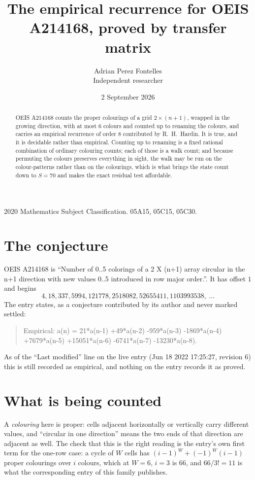\documentclass[11pt,a4paper]{article}
\title{The empirical recurrence for OEIS A214168, proved by transfer matrix}
\author{Adrian Perez Fontelles\\ \small Independent researcher}
\date{2 September 2026}
\theoremstyle{plain}
\theoremstyle{definition}
\begin{document}
\maketitle

\begin{abstract}
OEIS A214168 counts the proper colourings of a grid $2\times(n+1)$, wrapped in the growing direction, with at most $6$ colours and
counted up to renaming the colours, and carries an empirical recurrence of order $8$
contributed by R.~H.~Hardin. It is true, and it is decidable rather than empirical. Counting
up to renaming is a fixed rational combination of ordinary colouring counts; each of those is
a walk count; and because permuting the colours preserves everything in sight, the walk may be
run on the colour-patterns rather than on the colourings, which is what brings the state count
down to $S=70$ and makes the exact residual test affordable.
\end{abstract}

\noindent\small 2020 Mathematics Subject Classification. 05A15, 05C15, 05C30.\normalsize

\section{The conjecture}

OEIS A214168 is ``Number of 0..5 colorings of a 2 X (n+1) array circular in the n+1 direction with new values 0..5 introduced in row major order.''. It has offset $1$ and begins
\[
4, 18, 337, 5994, 121778, 2518082, 52655411, 1103993538,\ \dots
\]
The entry states, as a conjecture contributed by its author and never marked settled:
\begin{quote}
Empirical: a(n) = 21*a(n-1) +49*a(n-2) -959*a(n-3) -1869*a(n-4) +7679*a(n-5) +15051*a(n-6) -6741*a(n-7) -13230*a(n-8).
\end{quote}
As of the ``Last modified'' line on the live entry (Jun 18 2022 17:25:27, revision 6) this is still
recorded as empirical, and nothing on the entry records it as proved.

\section{What is being counted}

A \emph{colouring} here is proper: cells adjacent horizontally or vertically carry different
values, and ``circular in one direction'' means the two ends of that direction are adjacent as
well. The check that this is the right reading is the entry's own first term for the
one-row case: a cycle of $W$ cells has $(i-1)^W+(-1)^W(i-1)$ proper colourings over $i$
colours, which at $W=6$, $i=3$ is $66$, and $66/3!=11$ is what the corresponding entry of this
family publishes.
\end{document}
